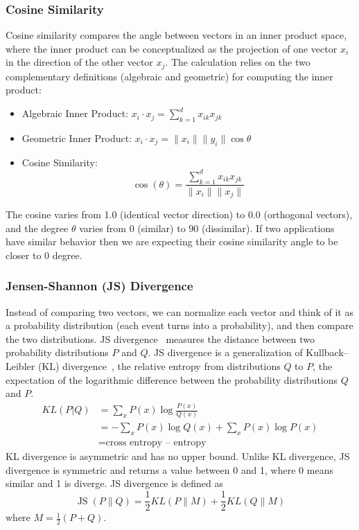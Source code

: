 \subsubsection{Cosine Similarity}
\label{sec:cos_sim}
Cosine similarity compares the angle between vectors in an inner product space, where the inner product can be conceptualized
as the projection of one vector $x_{i}$ in the direction of the other vector $x_{j}$. The calculation relies on the two complementary definitions (algebraic and geometric) for computing the inner product:
\begin{itemize}
\item 
Algebraic Inner Product:
$x_{i}\cdot x_{j}=\sum_{k=1}^{d} x_{ik} x_{jk}$
\item
Geometric Inner Product:
$x_{i}\cdot x_{j}=\|x_{i}\|\|y_{i}\|\cos\theta$
\item
Cosine Similarity:
\begin{equation}
\cos(\theta)=\frac{\sum_{k=1}^{d} x_{ik} x_{jk}}{\|x_{i}\|\|x_{j}\|}
\end{equation}
\end{itemize} 
The cosine varies from 1.0 (identical vector direction) to 0.0 (orthogonal vectors), and the degree $\theta$ varies from 0 (similar) to 90 (dissimilar). If two applications have similar behavior then we are expecting their cosine similarity angle to be closer to 0 degree.  

\subsubsection{Jensen-Shannon (JS) Divergence}
\label{sec:JS}
Instead of comparing two vectors, we can normalize each vector and think of it as a probability distribution (each event turns into a probability), and then compare the two distributions.
JS divergence~\cite{endres2003new} measures the distance between two probability distributions $P$ and $Q$. JS divergence is a generalization of  Kullback–Leibler (KL) divergence~\cite{kullback1951information}, the relative entropy from distributions $Q$ to $P$, \ie the expectation of the logarithmic difference between the probability distributions $Q$ and $P$. 
\begin{align*}
KL(P|Q)&=\sum_{x} P(x) \log \frac{P(x)}{Q(x)} \\ 
&=-\sum_{x} P(x) \log {Q(x)}+\sum_{x} P(x) \log {P(x)} \\ 
& =\textrm{cross entropy – entropy}
\end{align*}
KL divergence is asymmetric and has no upper bound. Unlike KL divergence, JS divergence is symmetric and returns a value between 0 and 1, where 0 means similar and 1 is diverge. %
JS divergence is defined as 
\begin{equation}
\operatorname{JS}(P \| Q)=\frac{1}{2} KL(P \| M)+\frac{1}{2} KL(Q \| M)
\end{equation}
where $M=\frac{1}{2}(P+Q)$.%

